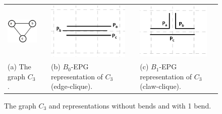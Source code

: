 
\begin{figure}[h]
  \centering
  \begin{tabular}{ p{3cm} p{0.7cm} p{4cm} p{0.7cm} p{4cm} }
    \includegraphics[width=2.3cm]{./img/trianguloabc} && \includegraphics[width=3.9cm]{./img/b0epgTransparenciaGrade2} & &
    \includegraphics[width=3.5cm]{./img/b1EpgTransparenteGrade2}
    \\
    \footnotesize
    (a) The  graph $C_3$. && \footnotesize(b) $B_0$-EPG representation of $C_3$ (edge-clique).&& \footnotesize(c) $B_1$-EPG representation of $C_3$ (claw-clique).\\
  \end{tabular}

 \caption{The  graph $ C_3 $  and  representations without bends and with 1 bend.} \label{fig:trianguloepgRepresentacao}
\end{figure}
